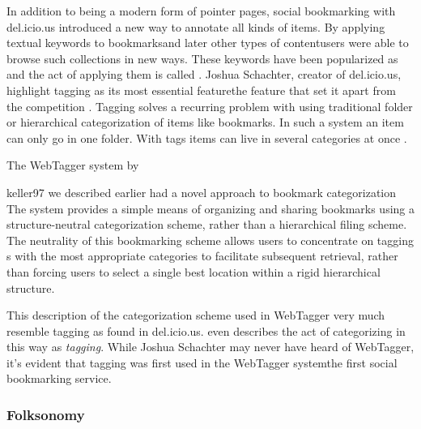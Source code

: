 In addition to being a modern form of pointer pages, social bookmarking
with del.icio.us introduced a new way to annotate all kinds of
items.%
By applying textual keywords to
bookmarks\dash{}and later other types of content\dash{}users were able to
browse such collections in new ways. These keywords have been popularized as
 and the act of applying them is called .%
Joshua Schachter, creator of del.icio.us, highlight tagging as its most
essential feature\dash{}the feature that set it apart from the competition
\cite[]{livingston07}. Tagging solves a recurring problem with
using traditional folder or hierarchical categorization of items like
bookmarks. In such a system an item can only go in one folder. With
tags items can live in several categories at once
\citep[]{weinberger07}.

The WebTagger system by
\begin{fullquote}[\p{1109}]{keller97}{%
  we described earlier had a novel approach to bookmark categorization}
    The system provides a simple means of organizing and sharing bookmarks
    using a structure-neutral categorization scheme, rather than a
    hierarchical filing scheme. The neutrality of this bookmarking scheme
    allows users to concentrate on tagging s with the most
    appropriate categories to facilitate subsequent retrieval, rather than
    forcing users to select a single best location within a rigid hierarchical
    structure.
\end{fullquote}

This description of the categorization scheme used in WebTagger very much
resemble tagging as found in del.icio.us. \citeauthor{keller97} even describes
the act of categorizing in this way as \emph{tagging}. While Joshua Schachter
may never have heard of WebTagger, it's evident that tagging was first used in
the WebTagger system\dash{}the first social bookmarking service.

\subsubsection{Folksonomy}

